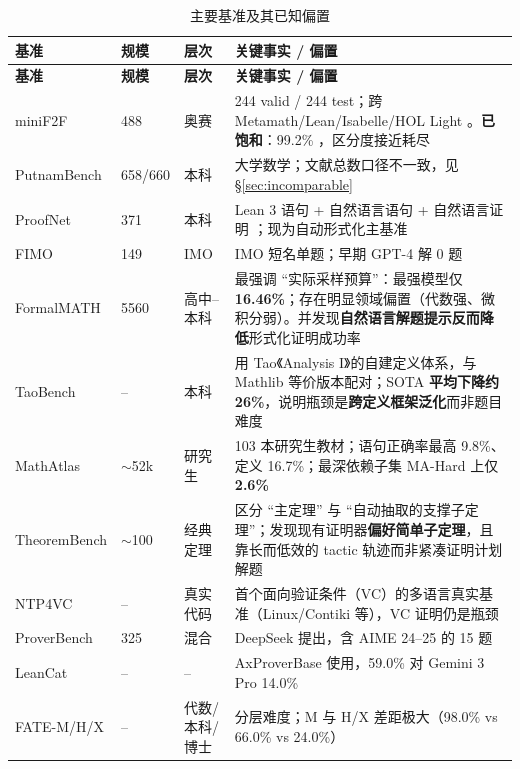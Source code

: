 \documentclass[UTF8,a4paper,11pt,fontset=windows]{ctexart}
\begin{document}
{\small
\begin{longtable}{@{}L{2.7cm}L{1.2cm}L{2.9cm}L{8.5cm}@{}}
\caption{主要基准及其已知偏置}\label{tab:bench}\\
\toprule
\textbf{基准} & \textbf{规模} & \textbf{层次} & \textbf{关键事实 / 偏置} \\
\midrule
\endfirsthead
\toprule
\textbf{基准} & \textbf{规模} & \textbf{层次} & \textbf{关键事实 / 偏置} \\
\midrule
\endhead
\bottomrule
\endfoot
miniF2F & 488 & 奥赛 & 244 valid / 244 test；跨 Metamath/Lean/Isabelle/HOL Light \cite{minif2f}。\textbf{已饱和}：99.2\% \cite{hilbert}，区分度接近耗尽 \\
PutnamBench & 658/660 & 本科 & 大学数学；文献总数口径不一致，见 \S\ref{sec:incomparable} \\
ProofNet & 371 & 本科 & Lean 3 语句 + 自然语言语句 + 自然语言证明 \cite{proofnet}；现为自动形式化主基准 \\
FIMO & 149 & IMO & IMO 短名单题；早期 GPT-4 解 0 题 \cite{fimo} \\
FormalMATH & 5560 & 高中--本科 & 最强调 ``实际采样预算''：最强模型仅 \textbf{16.46\%}；存在明显领域偏置（代数强、微积分弱）\cite{formalmmath}。并发现\textbf{自然语言解题提示反而降低}形式化证明成功率 \\
TaoBench & -- & 本科 & 用 Tao《Analysis I》的自建定义体系，与 Mathlib 等价版本配对；SOTA \textbf{平均下降约 26\%}，说明瓶颈是\textbf{跨定义框架泛化}而非题目难度 \cite{taobench} \\
MathAtlas & $\sim$52k & 研究生 & 103 本研究生教材；语句正确率最高 9.8\%、定义 16.7\%；最深依赖子集 MA-Hard 上仅 \textbf{2.6\%} \cite{mathatlas} \\
TheoremBench & $\sim$100 & 经典定理 & 区分 ``主定理'' 与 ``自动抽取的支撑子定理''；发现现有证明器\textbf{偏好简单子定理}，且靠长而低效的 tactic 轨迹而非紧凑证明计划解题 \cite{theorembench} \\
NTP4VC & -- & 真实代码 & 首个面向验证条件（VC）的多语言真实基准（Linux/Contiki 等），VC 证明仍是瓶颈 \cite{ntp4vc} \\
ProverBench & 325 & 混合 & DeepSeek 提出，含 AIME 24--25 的 15 题 \cite{dsprov2} \\
LeanCat & -- & -- & AxProverBase 使用，59.0\% 对 Gemini 3 Pro 14.0\% \cite{axprover} \\
FATE-M/H/X & -- & 代数/本科/博士 & 分层难度；M 与 H/X 差距极大（98.0\% vs 66.0\% vs 24.0\%）\cite{axprover} \\
\end{longtable}
}
\end{document}
